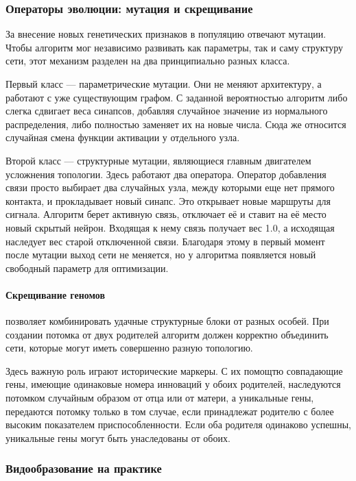 \subsubsection{Операторы эволюции: мутация и скрещивание}

За внесение новых генетических признаков в популяцию отвечают мутации. Чтобы алгоритм мог независимо развивать как параметры, так и саму структуру сети, этот механизм разделен на два принципиально разных класса.

Первый класс — параметрические мутации. Они не меняют архитектуру, а работают с уже существующим графом. С заданной вероятностью алгоритм либо слегка сдвигает веса синапсов, добавляя случайное значение из нормального распределения, либо полностью заменяет их на новые числа. Сюда же относится случайная смена функции активации у отдельного узла.

Второй класс — структурные мутации, являющиеся главным двигателем усложнения топологии. Здесь работают два оператора. Оператор добавления связи просто выбирает два случайных узла, между которыми еще нет прямого контакта, и прокладывает новый синапс. Это открывает новые маршруты для сигнала. Алгоритм берет активную связь, отключает её и ставит на её место новый скрытый нейрон. Входящая к нему связь получает вес 1.0, а исходящая наследует вес старой отключенной связи. Благодаря этому в первый момент после мутации выход сети не меняется, но у алгоритма появляется новый свободный параметр для оптимизации.

\paragraph{Скрещивание геномов} позволяет комбинировать удачные структурные блоки от разных особей. При создании потомка от двух родителей алгоритм должен корректно объединить сети, которые могут иметь совершенно разную топологию.

Здесь важную роль играют исторические маркеры. С их помощтю совпадающие гены, имеющие одинаковые номера инноваций у обоих родителей, наследуются потомком случайным образом от отца или от матери, а уникальные гены, передаются потомку только в том случае, если принадлежат родителю с более высоким показателем приспособленности. Если оба родителя одинаково успешны, уникальные гены могут быть унаследованы от обоих.


\subsubsection{Видообразование на практике}

